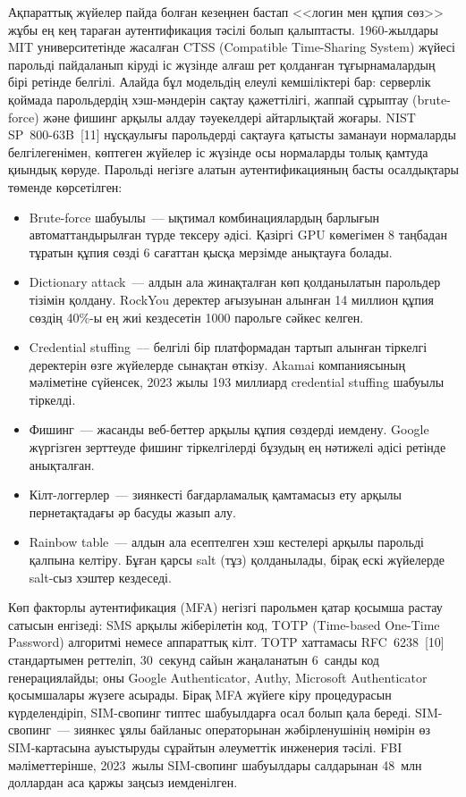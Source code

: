 \documentclass[14pt,a4paper]{extarticle}
\begin{document}
Ақпараттық жүйелер пайда болған кезеңнен бастап <<логин мен құпия сөз>> жұбы ең кең тараған аутентификация тәсілі болып қалыптасты. 1960-жылдары MIT университетінде жасалған CTSS (Compatible Time-Sharing System) жүйесі парольді пайдаланып кіруді іс жүзінде алғаш рет қолданған тұғырнамалардың бірі ретінде белгілі. Алайда бұл модельдің елеулі кемшіліктері бар: серверлік қоймада парольдердің хэш-мәндерін сақтау қажеттілігі, жаппай сұрыптау (brute-force) және фишинг арқылы алдау тәуекелдері айтарлықтай жоғары. NIST SP~800-63B~[11] нұсқаулығы парольдерді сақтауға қатысты заманауи нормаларды белгілегенімен, көптеген жүйелер іс жүзінде осы нормаларды толық қамтуда қиындық көруде. Парольді негізге алатын аутентификацияның басты осалдықтары төменде көрсетілген:
\begin{itemize}[nosep]
\item Brute-force шабуылы~--- ықтимал комбинациялардың барлығын автоматтандырылған түрде тексеру әдісі. Қазіргі GPU көмегімен 8 таңбадан тұратын құпия сөзді 6 сағаттан қысқа мерзімде анықтауға болады.
\item Dictionary attack~--- алдын ала жинақталған көп қолданылатын парольдер тізімін қолдану. RockYou деректер ағызуынан алынған 14 миллион құпия сөздің 40\%-ы ең жиі кездесетін 1000 парольге сәйкес келген.
\item Credential stuffing~--- белгілі бір платформадан тартып алынған тіркелгі деректерін өзге жүйелерде сынақтан өткізу. Akamai компаниясының мәліметіне сүйенсек, 2023 жылы 193 миллиард credential stuffing шабуылы тіркелді.
\item Фишинг~--- жасанды веб-беттер арқылы құпия сөздерді иемдену. Google жүргізген зерттеуде фишинг тіркелгілерді бұзудың ең нәтижелі әдісі ретінде анықталған.
\item Кілт-логгерлер~--- зиянкесті бағдарламалық қамтамасыз ету арқылы пернетақтадағы әр басуды жазып алу.
\item Rainbow table~--- алдын ала есептелген хэш кестелері арқылы парольді қалпына келтіру. Бұған қарсы salt (тұз) қолданылады, бірақ ескі жүйелерде salt-сыз хэштер кездеседі.
\end{itemize}

Көп факторлы аутентификация (MFA) негізгі парольмен қатар қосымша растау сатысын енгізеді: SMS арқылы жіберілетін код, TOTP (Time-based One-Time Password) алгоритмі немесе аппараттық кілт. TOTP хаттамасы RFC~6238~[10] стандартымен реттеліп, 30~секунд сайын жаңаланатын 6~санды код генерациялайды; оны Google Authenticator, Authy, Microsoft Authenticator қосымшалары жүзеге асырады. Бірақ MFA жүйеге кіру процедурасын күрделендіріп, SIM-свопинг типтес шабуылдарға осал болып қала береді. SIM-свопинг~--- зиянкес ұялы байланыс операторынан жәбірленушінің нөмірін өз SIM-картасына ауыстыруды сұрайтын әлеуметтік инженерия тәсілі. FBI мәліметтерінше, 2023~жылы SIM-свопинг шабуылдары салдарынан 48~млн доллардан аса қаржы заңсыз иемденілген.
\end{document}
